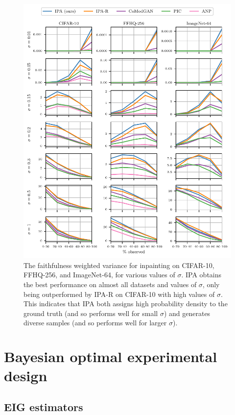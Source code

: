 \begin{figure}
  \includegraphics[width=\textwidth]{figs/cigcvae/fwv_sigma}
  \caption{The faithfulness weighted variance for inpainting on CIFAR-10,
    FFHQ-256, and ImageNet-64, for various values of $\sigma$. IPA obtains the
    best performance on almost all datasets and values of $\sigma$, only being
    outperformed by IPA-R on CIFAR-10 with high values of $\sigma$. This
    indicates that IPA both assigns high probability density to the ground truth
    (and so performs well for small $\sigma$) and generates diverse samples (and
    so performs well for larger $\sigma$).}
  \label{fig:cigcvae-fwv}
\end{figure}



\section{Bayesian optimal experimental design} \label{sec:cigcvae-supp-boed}

\subsection{EIG estimators}  \label{sec:cigcvae-eig-estimator}

